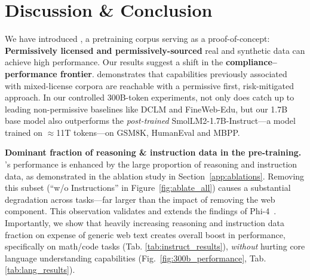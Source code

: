 \section{Discussion \& Conclusion}


We have introduced \MixtureVitae{}, a pretraining corpus serving as a proof-of-concept: \textbf{Permissively licensed and permissively-sourced} real and synthetic data can achieve high performance. Our results suggest a shift in the \textbf{compliance--performance frontier}. \MixtureVitae{} demonstrates that  capabilities previously associated with mixed-license corpora are reachable with a permissive first, risk-mitigated approach. In our controlled 300B-token experiments, not only does \MixtureVitae{} catch up to leading non-permissive baselines like DCLM and FineWeb-Edu, but our 1.7B base model also outperforms the \textit{post-trained} SmolLM2-1.7B-Instruct---a model trained on $\approx$11T tokens---on GSM8K, HumanEval and MBPP. 

\textbf{Dominant fraction of reasoning \& instruction data in the pre-training.} \MixtureVitae{}’s performance is enhanced by the large proportion of reasoning and instruction data, as demonstrated in the ablation study in Section~\ref{app:ablations}. Removing this subset (“w/o Instructions” in Figure~\ref{fig:ablate_all}) causes a substantial degradation across tasks—far larger than the impact of removing the web component. This observation validates and extends the findings of Phi-4~\citep{abdin2024phi4technicalreport}. Importantly, we show that heavily increasing reasoning and instruction data fraction on expense of generic web text creates overall boost in performance, specifically on math/code tasks (Tab. \ref{tab:instruct_results}), \textit{without} hurting core language understanding capabilities (Fig.~\ref{fig:300b_performance}, Tab. \ref{tab:lang_results}). 

